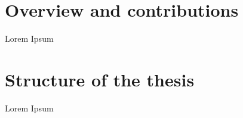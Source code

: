 \begin{refsection}
\section{Overview and contributions}
\label{sec:overview-and-contributions}
%
Lorem Ipsum

\section{Structure of the thesis}
\label{sec:structure-of-the-thesis}
%
Lorem Ipsum

\printbibliography[title=Reference,heading=bibintoc]

\end{refsection}